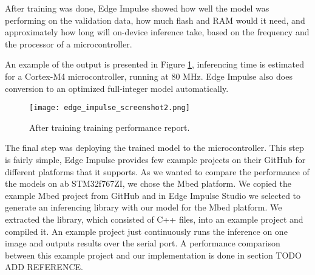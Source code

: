 After training was done, Edge Impulse showed how well the model was performing on the validation data, how much flash and RAM would it need, and approximately how long will on-device inference take, based on the frequency and the processor of a microcontroller.

An example of the output is presented in Figure \ref{edge_impulse_screenshot2}, inferencing time is estimated for a Cortex-M4 microcontroller, running at 80 \si{\mega\hertz}.
Edge Impulse also does conversion to an optimized full-integer model automatically.

\begin{figure}[ht]
    \centering
    \texttt{[image: edge\_impulse\_screenshot2.png]} 
    \caption{After training training performance report.}
    \label{edge_impulse_screenshot2}
\end{figure}

The final step was deploying the trained model to the microcontroller.
This step is fairly simple, Edge Impulse provides few example projects on their GitHub for different platforms that it supports.
As we wanted to compare the performance of the models on ab STM32f767ZI, we chose the Mbed platform.
We copied the example Mbed project from GitHub and in Edge Impulse Studio we selected to generate an inferencing library with our model for the Mbed platform.
We extracted the library, which consisted of C++ files, into an example project and compiled it.
An example project just continuously runs the inference on one image and outputs results over the serial port.
A performance comparison between this example project and our implementation is done in section TODO ADD REFERENCE.
